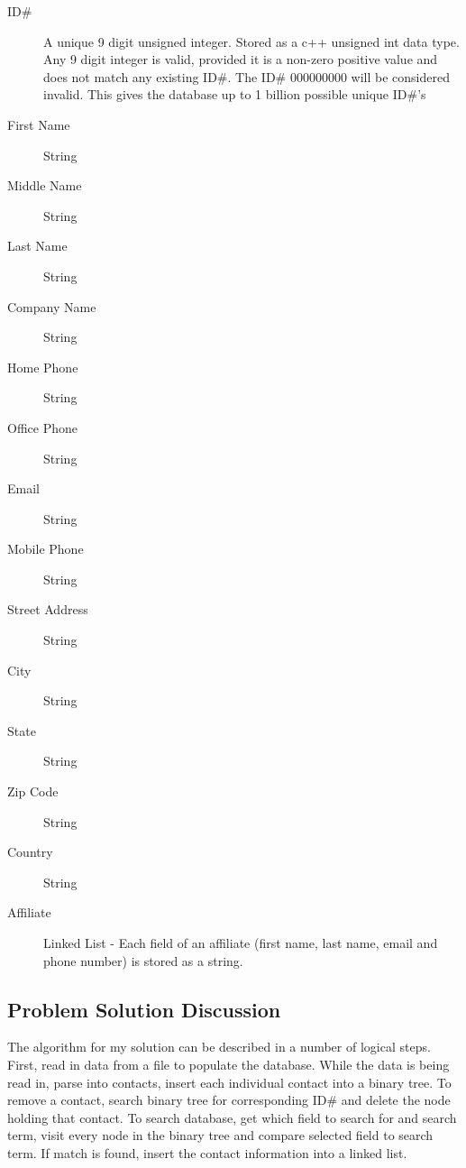 \documentclass[11pt]{article}
\begin{document}
	\begin{description}
	
		\item[ID\#] A unique 9 digit unsigned integer. Stored as a c++ unsigned int data type. Any 9 digit integer is valid, 
					provided it is a non-zero positive value and does not match any existing ID\#. The ID\# 000000000 will
					be considered invalid. This gives the database up to 1 billion possible unique ID\#'s
					 
		\item[First Name] String
		\item[Middle Name] String
		\item[Last Name] String
		\item[Company Name] String
		\item[Home Phone] String
		\item[Office Phone] String
		\item[Email] String
		\item[Mobile Phone] String
		\item[Street Address] String
		\item[City] String
		\item[State] String
		\item[Zip Code] String
		\item[Country] String
		\item[Affiliate] Linked List - Each field of an affiliate (first name, last name, email and phone number) is stored
										as a string.
		
	\end{description}




\subsection*{Problem Solution Discussion}

The algorithm for my solution can be described in a number of logical steps. First, read in data from a file to populate the database. 
While the data is being read in, parse into contacts, insert each individual contact into a binary tree. To remove a contact, 
search binary tree for corresponding ID\# and delete the node holding that contact. To search database, get which field to 
search for and search term, visit every node in the binary tree and compare selected field to search term. If match is found,
 insert the contact information into a linked list. 
\end{document}
